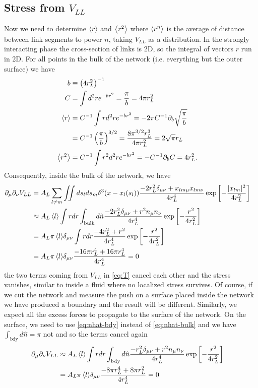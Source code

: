 \documentclass[nofootinbib,preprint,floatfix,titlepage,endfloats,superscriptaddress]{revtex4} %
\begin{document}
\subsection{Stress from $V_{LL}$}
Now we need to determine $\left<r\right>$ and $\left<r^2\right>$ where $\left<r^n\right>$ is the average of distance between link segments to power $n$, taking $V_{LL}$ as a distribution. 
In the strongly interacting phase the %
cross-section of links is 2D, so the integral of vectors $r$ run in 2D. 
For all points in the bulk of the network (i.e. everything but the outer surface) we have
\begin{align}
b &\equiv \left(4r_L^2\right)^{-1}\cr
C &= \int d^2 r e^{-br^2} = {\pi\over b} = 4\pi r_L^2 \cr
\left<r\right> &= C^{-1}\int r d^2 r e^{-br^2} = - 2\pi C^{-1}\partial_b \sqrt{{\pi\over b}} \cr &= C^{-1} \left({\pi\over b}\right)^{3/2}    = {8\pi^{3/2} r_L^3\over 4 \pi r_L^2} = 2\sqrt{\pi} r_L \cr
\left<r^2\right> &= C^{-1}\int r^2 d^2 r e^{-b r^2} = - C^{-1}\partial_b C = 4r_L^2.
\end{align}
%
Consequently, inside the bulk of the network, we have 
\begin{align}
    \partial_\mu\partial_\nu V_{LL} & = A_L\sum_{l\ne m} \iint ds_l ds_m \delta^3(x-x_l(s_l))\frac{-2r_L^2\delta_{\mu\nu}+ x_{lm\mu} x_{lm\nu}}{4r_L^4}
    \exp\left[- {|x_{lm}|^2 \over 4 r_L^2}\right]\cr 
    & \approx {A_L\left<l\right>} \int r dr \int_\mathrm{bulk} d\hat{n} \frac{-2r_L^2\delta_{\mu\nu}+ r^2 n_\mu n_\nu}{4r_L^4}
    \exp\left[- {r^2 \over 4 r_L^2}\right]\cr
    &= {A_L\pi\left<l\right>} \delta_{\mu\nu} \int r dr  \frac{-4 r_L^2+ r^2 }{4r_L^4}
    \exp\left[- {r^2 \over 4 r_L^2}\right]\cr
    &= {A_L\pi\left<l\right>} \delta_{\mu\nu}  \frac{-16\pi r_L^4+ 16\pi r_L^4 }{4r_L^4} = 0 
    \label{eq:stress-bulk}
\end{align}
the two terms coming from $V_{LL}$ in \eqref{eq:T} cancel each other and the stress vanishes, similar to inside a fluid where no localized stress survives. 
Of course, if we cut the network and measure the push on a surface placed inside the network we have produced a boundary and the result will be different. 
Similarly, we expect all the excess forces to propagate to the surface of the network. 
On the surface, we need to use \eqref{eq:nhat-bdy}  instead of \eqref{eq:nhat-bulk} and we have $\int_\mathrm{bdy} d\hat{n} = \pi $ not and so the terms cancel again
\begin{align}
    \ro_\mu\ro_\nu V_{LL} 
    & \approx {A_L\be{l}} \int r dr \int_\mathrm{bdy} d\hat{n} \frac{-r_L^2\delta_{\mu\nu}+ r^2 n_\mu n_\nu}{4r_L^4}
    \exp\left[- {r^2 \over 4 r_L^2}\right]\cr
    &= {A_L\pi\be{l}} \delta_{\mu\nu}  \frac{-8\pi r_L^4+ 8\pi r_L^2 }{4r_L^4} =0%
    \label{eq:stress-bdy}
\end{align}
\end{document}
